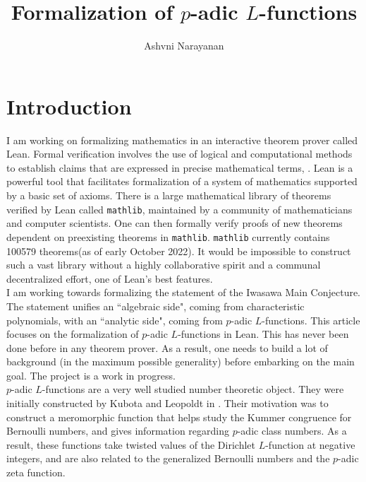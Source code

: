 \documentclass[11pt]{article}
\title{Formalization of $p$-adic $L$-functions}
\author{Ashvni Narayanan}
\begin{document}
\maketitle
\tableofcontents

\setlength{\parindent}{0pt}
\section{Introduction}
I am working on formalizing mathematics in an interactive theorem prover called Lean. 
Formal verification involves the use of logical and computational methods to establish 
claims that are expressed in precise mathematical terms, \cite{TPIL}. Lean is a powerful tool 
that facilitates formalization of a system of mathematics supported by a basic set of axioms. There is a large mathematical library of theorems verified by Lean called \texttt{mathlib}, maintained by a community of mathematicians and computer scientists. One can then 
formally verify proofs of new theorems dependent on preexisting theorems in \texttt{mathlib}. 
\texttt{mathlib} currently contains 100579 theorems(as of early October 2022). It would be impossible to construct 
such a vast library without a highly collaborative spirit and a communal decentralized effort, one of 
Lean's best features. \\
I am working towards formalizing the statement of the Iwasawa Main Conjecture.
The statement unifies an ``algebraic side", coming from characteristic polynomials,
with an ``analytic side", coming from $p$-adic $L$-functions. This article focuses on the 
formalization of $p$-adic $L$-functions in Lean. This has never been done before in any 
theorem prover. As a result, one needs to build a lot of background (in the maximum possible generality) 
before embarking on the main goal. The project is a work in progress. \\

$p$-adic $L$-functions are a very well studied number theoretic object. They were initially constructed 
by Kubota and Leopoldt in \cite{KL}. Their motivation was to construct a meromorphic function that helps study 
the Kummer congruence for Bernoulli numbers, and gives information regarding $p$-adic class numbers. 
As a result, these functions take twisted values of the Dirichlet $L$-function at negative integers, and 
are also related to the generalized Bernoulli numbers and the $p$-adic zeta function. \\
\end{document}
